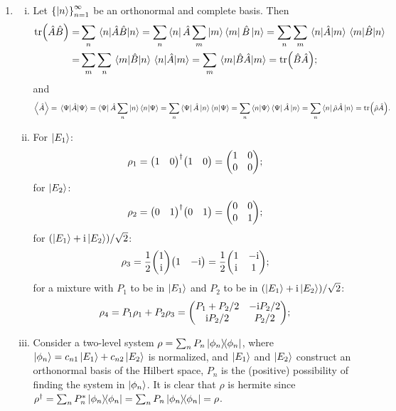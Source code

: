 \documentclass{article}
\newcommand{\iu}{\ensuremath{\mathrm{i}}}
\newcommand{\set}[1]{\ensuremath{\left\{{#1}\right\}}}
\begin{document}
\begin{enumerate}[1.]
  \item
  \begin{enumerate}[(i)]
    \item Let $\set{\ket{n}}_{n=1}^{\infty}$ be an orthonormal and complete basis. Then 
    \begin{align*}
      \tr(\hat{A}\hat{B}) =& \sum_n \ev{\hat{A}\hat{B}}{n} = \sum_n \bra{n}\hat{A}\sum_m\ket{m}\bra{m}\hat{B}\ket{n} = \sum_n \sum_m \mel{n}{\hat{A}}{m} \mel{m}{\hat{B}}{n} \\
      =& \sum_m \sum_n \mel{m}{\hat{B}}{n} \mel{n}{\hat{A}}{m} = \sum_m \ev{\hat{B}\hat{A}}{m} = \tr(\hat{B}\hat{A});
    \end{align*}
    and
    \begin{align*}
      \ev{\hat{A}} = \ev{\hat{A}}{\Psi} = \bra{\Psi}\hat{A}\sum_n \ket{n}\bra{n}\ket{\Psi} 
      = \sum_n \bra{\Psi}\hat{A}\ket{n}\bra{n}\ket{\Psi} =\sum_n \bra{n}\ket{\Psi} \bra{\Psi}\hat{A}\ket{n} = \sum_n \bra{n}\hat{\rho}\hat{A}\ket{n} = \tr(\hat{\rho} \hat{A}).
    \end{align*}
    \item For $\ket{E_1}$:
    \begin{align*}
      \rho_1 = \mqty(1 & 0)^\dagger\mqty(1 & 0) = \mqty(
        1 & 0 \\ 0 & 0
      );
    \end{align*}
    for $\ket{E_2}$:
    \begin{align*}
      \rho_2 = \mqty(0 & 1)^\dagger\mqty(0 & 1) = \mqty(
        0 & 0 \\ 0 & 1
      );
    \end{align*}
    for $(\ket{E_1} + \iu\ket{E_2})/\sqrt{2}$:
    \begin{align*}
      \rho_3 = \frac{1}{2} \mqty(1 \\ \iu)\mqty(1 & -\iu) = \frac{1}{2}\mqty(
        1 & -\iu \\ \iu & 1
      );
    \end{align*}
    for a mixture with $P_1$ to be in $\ket{E_1}$ and $P_2$ to be in $(\ket{E_1} + \iu\ket{E_2})/\sqrt{2}$:
    \begin{align*}
      \rho_4 = P_1 \rho_1 + P_2 \rho_3 = \mqty(
        P_1 + P_2/2 & -\iu P_2/2 \\ \iu P_2/2 & P_2/2
      );
    \end{align*}
    \item Consider a two-level system $\rho = \sum_n P_n \op{\phi_n}$, where $\ket{\phi_n} = c_{n1}\ket{E_1} + c_{n2}\ket{E_2}$ is normalized, and $\ket{E_1}$ and $\ket{E_2}$ construct an orthonormal basis of the Hilbert space, $P_n$ is the (positive) possibility of finding the system in $\ket{\phi_n}$. It is clear that $\rho$ is hermite since $\rho^\dagger = \sum_n P_n^* \op{\phi_n} = \sum_n P_n \op{\phi_n} = \rho$. 

\end{enumerate}
\end{enumerate}
\end{document}
